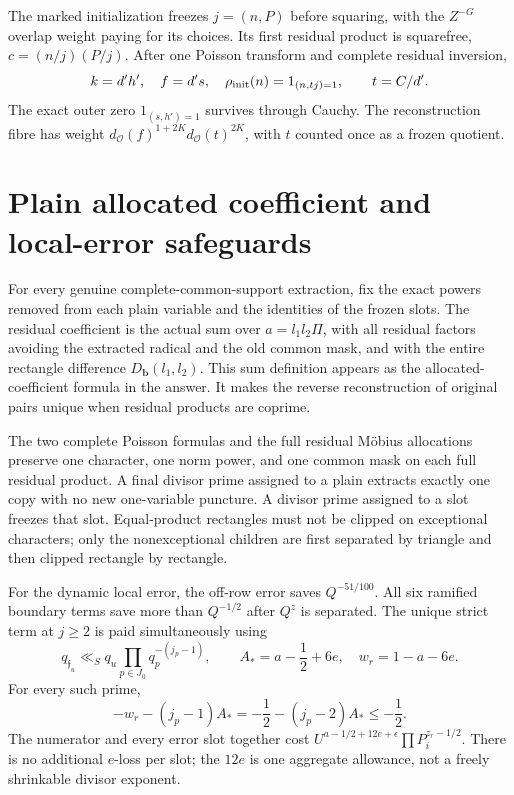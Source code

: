 \documentclass[12pt]{article}
\begin{document}
The marked initialization freezes \(j=(n,P)\) before squaring,
with the \(Z^{-G}\) overlap weight paying for its choices.
Its first residual product is squarefree, \(c=(n/j)(P/j)\).
After one Poisson transform and complete residual inversion,
\[
 k=d'h',\quad f=d's,\quad \rho_{\rm init}(n)=1_{(n,tj)=1},
 \qquad t=C/d'.
\]
The exact outer zero \(1_{(s,h')=1}\) survives through Cauchy.
The reconstruction fibre has weight
\(d_{\mathcal O}(f)^{1+2K}d_{\mathcal O}(t)^{2K}\),
with \(t\) counted once as a frozen quotient.

\section{Plain allocated coefficient and local-error safeguards}
For every genuine complete-common-support extraction, fix the
exact powers removed from each plain variable and the identities
of the frozen slots.  The residual coefficient is the actual sum
over \(a=l_1l_2\Pi\), with all residual factors avoiding the
extracted radical and the old common mask, and with the entire
rectangle difference \(D_{\mathbf b}(l_1,l_2)\).
This sum definition appears as the allocated-coefficient formula
in the answer.  It makes the reverse reconstruction of original
pairs unique when residual products are coprime.

The two complete Poisson formulas and the full residual M\"obius
allocations preserve one character, one norm power, and one common
mask on each full residual product.  A final divisor prime assigned
to a plain extracts exactly one copy with no new one-variable
puncture.  A divisor prime assigned to a slot freezes that slot.
Equal-product rectangles must not be clipped on exceptional
characters; only the nonexceptional children are first separated
by triangle and then clipped rectangle by rectangle.

For the dynamic local error, the off-row error saves \(Q^{-51/100}\).
All six ramified boundary terms save more than \(Q^{-1/2}\)
after \(Q^z\) is separated.  The unique strict term at \(j\ge2\)
is paid simultaneously using
\[
 q_{\mathfrak f_u}\ll_S q_u
       \prod_{p\in J_0}q_p^{-(j_p-1)},\qquad
 A_*=a-\frac12+6e,\quad w_r=1-a-6e.
\]
For every such prime,
\[
 -w_r-(j_p-1)A_*=-\frac12-(j_p-2)A_*\le-\frac12 .
\]
The numerator and every error slot together cost
\(U^{a-1/2+12e+\epsilon}\prod P_i^{z_r-1/2}\).
There is no additional \(e\)-loss per slot; the \(12e\) is one
aggregate allowance, not a freely shrinkable divisor exponent.
\end{document}

